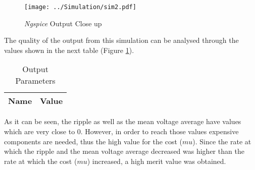 \begin{figure}[H]
    \centering
    \texttt{[image: ../Simulation/sim2.pdf]}
    \caption{{\it Ngspice} Output Close up}
    \label{fig:ngsOutClose}
\end{figure}



The quality of the output from this simulation can be analysed through the values shown in the next table (Figure \ref{tab:ngsOutParam}).

\begin{table}[H]
  \centering
  \begin{tabular}{|l|r|}
    \hline    
    {\bf Name} & {\bf Value} \\ \hline
    
  \end{tabular}
  \caption{Output Parameters}
  \label{tab:ngsOutParam}
\end{table}


As it can be seen, the ripple as well as the mean voltage average have values which are very close to 0. However, in order to reach those values expensive components are needed, thus the high value for the cost ($mu$). Since the rate at which the ripple and the mean voltage average decreased was higher than the rate at which the cost ($mu$) increased, a high merit value was obtained.



